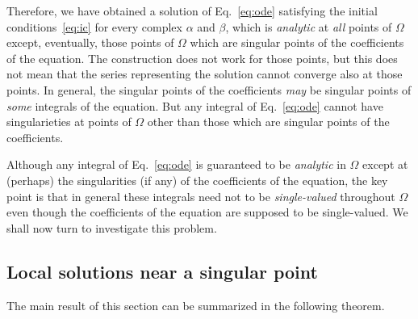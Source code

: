 Therefore,  we have obtained a solution of
Eq.~\eqref{eq:ode} satisfying the initial conditions~\eqref{eq:ic} for every
complex $\alpha$ and $\beta$, which is \emph{analytic} at \emph{all} points of
$\Omega$ except, eventually, those points of $\Omega$ which are singular points
of the coefficients of the equation. The construction does not work for those
points, but this does not mean that the series representing the solution cannot
converge also at those points. In general, the singular points of the
coefficients \emph{may} be singular points of \emph{some} integrals of the
equation.  But any integral of Eq.~\eqref{eq:ode} cannot have singularieties at
points of $\Omega$ other than those which are singular points of the
coefficients.

Although any integral of Eq.~\eqref{eq:ode} is guaranteed to be \emph{analytic}
in $\Omega$ except at (perhaps) the singularities (if any) of the coefficients
of the equation, the key point is that in general these integrals need not to be
\emph{single-valued} throughout $\Omega$ even though the coefficients of the
equation are supposed to be single-valued.  We shall now turn to investigate
this problem.


\subsection{Local solutions near a singular point}

The main result of this section can be summarized  in the following theorem.

